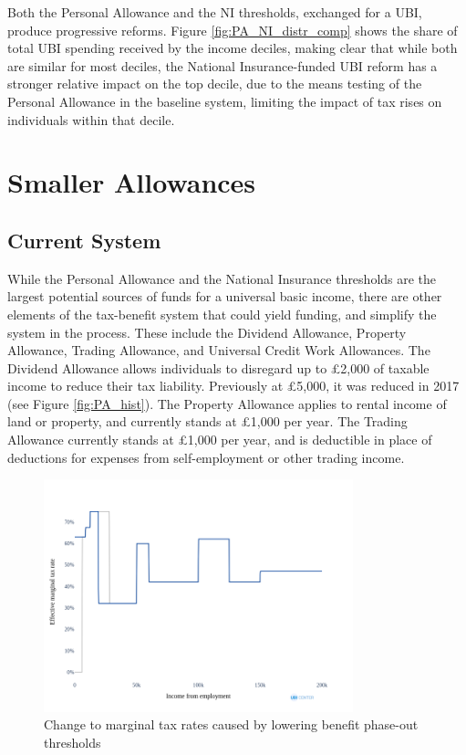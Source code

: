 \documentclass{article}
\begin{document}
    Both the Personal Allowance and the NI thresholds, exchanged for a UBI, produce progressive reforms. Figure \ref{fig:PA_NI_distr_comp} shows the share of total UBI spending received by the income deciles, making clear that while both are similar for most deciles, the National Insurance-funded UBI reform has a stronger relative impact on the top decile, due to the means testing of the Personal Allowance in the baseline system, limiting the impact of tax rises on individuals within that decile.

    \section{Smaller Allowances}

    \subsection{Current System}

    While the Personal Allowance and the National Insurance thresholds are the largest potential sources of funds for a universal basic income, there are other elements of the tax-benefit system that could yield funding, and simplify the system in the process. These include the Dividend Allowance, Property Allowance, Trading Allowance, and Universal Credit Work Allowances. The Dividend Allowance allows individuals to disregard up to £2,000 of taxable income to reduce their tax liability. Previously at £5,000, it was reduced in 2017 (see Figure \ref{fig:PA_hist}). The Property Allowance applies to rental income of land or property, and currently stands at £1,000 per year. The Trading Allowance currently stands at £1,000 per year, and is deductible in place of deductions for expenses from self-employment or other trading income.

    \begin{figure}
        \centering
        \includegraphics[width=0.8\textwidth]{images/fig_11.png}
        \caption{Change to marginal tax rates caused by lowering benefit phase-out thresholds}
        \label{fig:benefit_mtr_changes}
    \end{figure}
\end{document}
